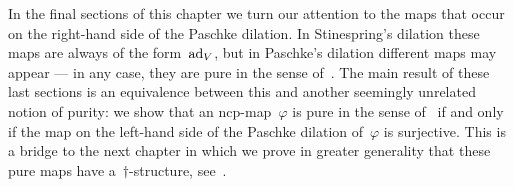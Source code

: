 \begin{parsec}
\begin{point}
\begin{point}
In the final sections of this chapter we turn our attention to the maps
    that occur on the right-hand side of the Paschke dilation.
In Stinespring's dilation these maps are always of the form~$\mathrm{ad}_V$,
    but in Paschke's dilation different maps may appear ---
    in any case, they are pure in the sense of~.
The main result of these last sections
    is an equivalence between this and another
    seemingly unrelated notion of purity:
    we show that an ncp-map~$\varphi$ is pure in the sense of~
    if and only if the map on the left-hand side of
    the Paschke dilation of~$\varphi$ is surjective.
This is a bridge to the next chapter
    in which we prove in greater generality
    that these pure maps have a~$\dagger$-structure,
    see~.
\end{point}
\end{point}
\end{parsec}


